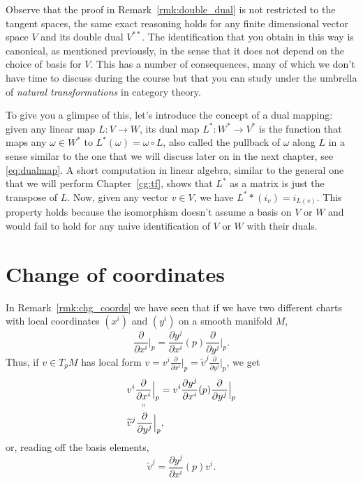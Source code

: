 \begin{remark}
	Observe that the proof in Remark~\ref{rmk:double_dual} is not restricted to the tangent spaces, the same exact reasoning holds for any finite dimensional vector space $V$ and its double dual $V^{**}$.
	The identification that you obtain in this way is canonical, as mentioned previously, in the sense that it does not depend on the choice of basis for $V$. This has a number of consequences, many of which we don't have time to discuss during the course but that you can study under the umbrella of \emph{natural transformations} in category theory.

	To give you a glimpse of this, let's introduce the concept of a dual mapping: given any linear map $L:V\to W$, its dual map $L^* : W^* \to V^*$ is the function that maps any $\omega\in W^*$ to $L^*(\omega) = \omega \circ L$, also called the pullback of $\omega$ along $L$ in a sense similar to the one that we will discuss later on in the next chapter, see \eqref{eq:dualmap}.
	A short computation in linear algebra, similar to the general one that we will perform Chapter~\ref{cg:tf}, shows that $L^*$ as a matrix is just the transpose of $L$. Now, given any vector $v\in V$, we have $L^**(i_v)=i_{L(v)}$. This property holds because the isomorphism doesn't assume a basis on $V$ or $W$ and would fail to hold for any naive identification of $V$ or $W$ with their duals.
\end{remark}

\section{Change of coordinates}
In Remark~\ref{rmk:chg_coords} we have seen that if we have two different charts with local coordinates $(x^i)$ and $(y^i)$ on a smooth manifold $M$,
\begin{equation}
	\frac{\partial}{\partial x^i}\Big|_p = \frac{\partial y^j}{\partial x^i}(p) \frac{\partial}{\partial y^j}\Big|_p.
\end{equation}
Thus, if $v\in T_pM$ has local form $v = v^i \frac{\partial}{\partial x^i}\big|_p = \widetilde v^j \frac{\partial}{\partial y^j}\big|_p$, we get
\begin{align}
	 & \underset{\shortparallel}{v^i \frac{\partial}{\partial x^i}\Big|_p} = v^i \frac{\partial y^j}{\partial x^i}(p) \frac{\partial}{\partial y^j}\Big|_p \\
	 & \widetilde v^j \frac{\partial}{\partial y^j}\Big|_p,
\end{align}
or, reading off the basis elements,
\begin{equation}\label{eq:contravariant}
	\widetilde v^j = \frac{\partial y^j}{\partial x^i}(p) v^i.
\end{equation}

